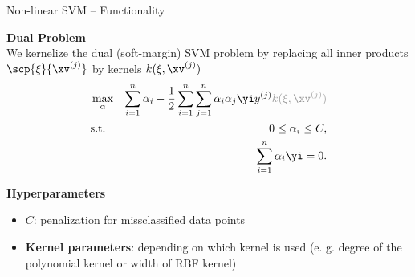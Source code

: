 \documentclass[11pt,compress,t,notes=noshow, xcolor=table]{beamer}
\newcommand{\highlight}[1]{\textcolor{highlightcol}{\textbf{#1}}}
\begin{document}
\begin{frame}{Non-linear SVM -- Functionality}

\footnotesize

\highlight{Dual Problem} \\
We kernelize the dual (soft-margin) SVM problem by replacing all inner products $\scp{\xi}{\xv^{(j)}}$ by kernels $k(\xi, \xv^{(j)})$
\begin{eqnarray*}
    & \max_{\alpha} & \sum_{i=1}^n \alpha_i - \frac{1}{2}\sum_{i=1}^n\sum_{j=1}^n\alpha_i\alpha_j\yi y^{(j)} \textcolor{highlightcol}{k(\xi, \xv^{(j)})}  \\
    & \text{s.t. } & 0 \le \alpha_i \le C, \\
    & \quad & \sum_{i=1}^n \alpha_i \yi = 0. 
\end{eqnarray*}


\medskip


\highlight{Hyperparameters}

\begin{itemize}
  \item \textbf{$C$}: penalization for missclassified data points 
  \item \textbf{Kernel parameters}: depending on which kernel is used (e. g. degree of the polynomial kernel or width of RBF kernel)

\end{itemize}

\medskip




\end{frame}

\end{document}
